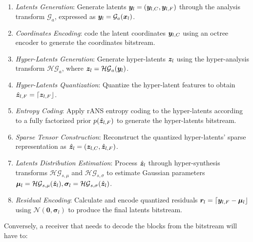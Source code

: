 \begin{enumerate}[label=E\arabic*.]
    \item \textit{Latents Generation}: Generate latents $\y_l = (\y_{l, C}, \y_{l, F})$ through the analysis transform $\mathcal{G}_a$, expressed as $\y_l=\mathcal{G}_a(\x_l)$.
    \item \textit{Coordinates Encoding}: code the latent coordinates $\y_{l, C}$ using an octree encoder to generate the coordinates bitstream.
    \item \textit{Hyper-Latents Generation}: Generate hyper-latents $\z_l$ using the hyper-analysis transform $\mathcal{HG}_a$, where $\z_l=\mathcal{HG}_a(\y_l)$.
    \item \textit{Hyper-Latents Quantization}: Quantize the hyper-latent features to obtain $\hat{\z}_{l, F} = \lceil \z_{l, F} \rfloor$.
    \item \textit{Entropy Coding}: Apply rANS entropy coding to the hyper-latents according to a fully factorized prior $p(\hat{\z}_{l, F})$ to generate the hyper-latents bitstream.
    \item \textit{Sparse Tensor Construction}: Reconstruct the quantized hyper-latents' sparse representation as $\hat{\z}_l = (\z_{l, C}, \hat{\z}_{l, F})$.
    \item \textit{Latents Distribution Estimation}: Process $\hat{\z}_l$ through hyper-synthesis transforms $\mathcal{HG}_{s, \mu}$ and $\mathcal{HG}_{s, \sigma}$ to estimate Gaussian parameters $\boldsymbol{\mu}_l = \mathcal{HG}_{s, \mu}(\hat{\z}_l), \boldsymbol{\sigma }_l= \mathcal{HG}_{s, \sigma}(\hat{\z}_l)$. 
    \item \textit{Residual Encoding}: Calculate and encode quantized residuals $\boldsymbol{r}_l= \lceil \y_{l,F} - \boldsymbol{\mu}_l \rfloor$ using $\mathcal{N}(\boldsymbol{0}, \boldsymbol{\sigma}_l)$ to produce the final latents bitstream.
\end{enumerate}

Conversely, a receiver that needs to decode the blocks from the bitstream will have to:

